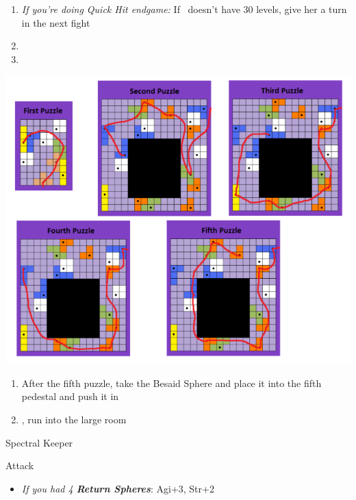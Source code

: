 \begin{spheregrid}
\begin{multicols}{2}
\begin{itemize}
\begin{itemize}
            \end{itemize}
    \end{itemize}
  \end{multicols}
\end{spheregrid}
\begin{multicols}{2}
\begin{enumerate}[resume]
  \item \textit{If you're doing Quick Hit endgame:} If \rikku\ doesn't have 30 levels, give her a turn in the next fight
  \item \formation{\tidus}{\yuna}{\auron}
  \item \save
\end{enumerate}
\includegraphics[scale=.8]{graphics/zanarkandpuzzles}
\begin{enumerate}[resume]
  \item After the fifth puzzle, take the Besaid Sphere and place it into the fifth pedestal and push it in
  \item \cs, run into the large room
\end{enumerate}
\begin{battle}[52000]{Spectral Keeper}
  \begin{itemize}
    \summon{\bahamut}
    \bahamutf Attack
  \end{itemize}
\end{battle}
\begin{spheregrid}
  \begin{itemize}
    \item \textit{If you had 4 \textbf{Return Spheres}}: Agi+3, Str+2

\end{itemize}
\end{spheregrid}
\end{multicols}
